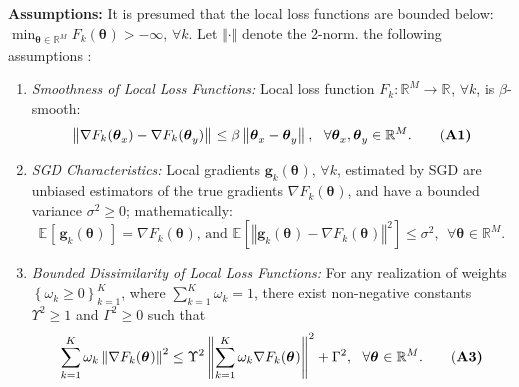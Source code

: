 \documentclass{article}
\newcommand{\shams}[1]{{\color{red}{#1}}}
\renewcommand{\shams}[1]{{\color{black}{#1}}}
\newcommand{\E}[2]{\mathbb{E}_{#2}\left[#1\right]}
\newcommand{\R}[1]{\mathbb{R}^{#1}}
\renewcommand{\vec}[3]{\boldsymbol{#1}_{#2}^{#3}}
\newcommand{\mset}[3]{\left\{#1\right\}_{#2}^{#3}}
\newcommand{\norm}[2]{\left\Vert#1\right\Vert_{#2}}
\newcommand{\eqn}[1]{{\begin{equation}#1\end{equation}}}
\begin{document}
\textbf{Assumptions:} It is presumed that the local loss functions are bounded below: $\min_{\vec{\theta}{}{}\in\mathbb{R}^{M}} F_k(\vec{\theta}{}{}) > -\infty$, $\forall k$. Let {\small$\Vert\cdot\Vert$} denote the 2-norm. \shams{Our analysis uses} the following \shams{standard} assumptions \citep{wang2020tackling, friedlander2012hybrid, hosseinalipour2020multi, li2019convergence, stich2018local}:
\begin{enumerate}[leftmargin=5mm]
    \vspace{-2.2mm}
    \item \textit{Smoothness of Local Loss Functions:} Local loss function $F_k: \R{M} \to \R{}$, $\forall k$, is $\beta$-smooth: 
    \eqn{
        \norm{ \nabla F_k(\vec{\theta}{x}{}) - \nabla F_k(\vec{\theta}{y}{}) }{} \leq \beta\norm{ \vec{\theta}{x}{}-\vec{\theta}{y}{} }{}, \\~~\forall \vec{\theta}{x}{}, \vec{\theta}{y}{} \in \R{M}.
        \label{eqn:lipschitz}
        \tag{\bf A1}
    }
    \vspace{-3.1mm}
    \item \textit{SGD Characteristics:} Local gradients $\vec{g}{k}{}(\vec{\theta}{}{})$, $\forall k$, estimated by SGD are unbiased estimators of the true gradients $\nabla F_k(\vec{\theta}{}{})$, and have a bounded variance $\sigma^2 \geq 0$; mathematically:
    \eqn{
        \E{ \,\vec{g}{k}{}(\vec{\theta}{}{})\, }{}= \nabla F_k(\vec{\theta}{}{}) \text{, and } \E{  \norm{\vec{g}{k}{}(\vec{\theta}{}{}) - \nabla F_k(\vec{\theta}{}{})}{}^2}{} \leq \sigma^2, ~~\forall \vec{\theta}{}{}\in \R{M}.
        \label{eqn:sgd_noise}
        \tag{\bf A2}
    }
    \vspace{-3.5mm}
    \item \textit{Bounded Dissimilarity of Local Loss Functions:} For any realization of weights $\mset{\omega_k \geq 0}{k=1}{K}$, where $\sum_{k=1}^{K}\omega_k = 1$, there exist non-negative constants $\Upsilon^2 \geq 1$ and $\Gamma^2\geq 0$ such that
    \vspace{-2mm}
    \eqn{
        \sum_{k=1}^{K} \omega_k \norm{\nabla F_k(\vec{\theta}{}{})}{}^2 \leq \Upsilon^2 \norm{ \sum_{k=1}^{K}\omega_k \nabla F_k(\vec{\theta}{}{}) }{}^2 + \Gamma^2,~~\forall \vec{\theta}{}{}\in \R{M}.
        \label{eqn:bbd_diversity}
        \tag{\bf A3}
        \vspace{-.1mm}
    }
\end{enumerate}
\end{document}
